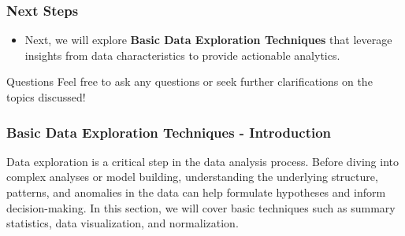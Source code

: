 \documentclass[aspectratio=169]{beamer}
\begin{document}
\begin{frame}[fragile]
    \frametitle{Next Steps}
    \begin{itemize}
        \item Next, we will explore \textbf{Basic Data Exploration Techniques} that leverage insights from data characteristics to provide actionable analytics.
    \end{itemize}

    \begin{block}{Questions}
        Feel free to ask any questions or seek further clarifications on the topics discussed!
    \end{block}
\end{frame}

\begin{frame}[fragile]
    \frametitle{Basic Data Exploration Techniques - Introduction}
    Data exploration is a critical step in the data analysis process. Before diving into complex analyses or model building, understanding the underlying structure, patterns, and anomalies in the data can help formulate hypotheses and inform decision-making. In this section, we will cover basic techniques such as summary statistics, data visualization, and normalization.
\end{frame}
\end{document}
